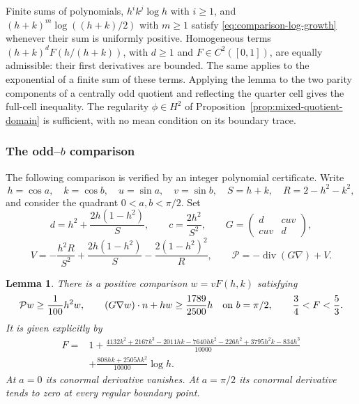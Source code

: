 \documentclass[reqno,11pt]{amsart}
\numberwithin{equation}{section}
\newtheorem{lemma}[theorem]{Lemma}
\theoremstyle{remark}
\begin{document}
Finite sums of polynomials, $h^ik^j\log h$ with $i\geq1$, and
$(h+k)^m\log((h+k)/2)$ with $m\geq1$ satisfy
\eqref{eq:comparison-log-growth} whenever their sum is uniformly
positive.  Homogeneous terms $(h+k)^d F(h/(h+k))$, with
$d\geq1$ and $F\in C^2([0,1])$, are equally admissible: their
first derivatives are bounded. The same applies to the exponential
of a finite sum of these terms. Applying the lemma to the two parity
components of a centrally odd quotient and reflecting the quarter
cell gives the full-cell inequality. The regularity
$\phi\in H^2$ of Proposition~\ref{prop:mixed-quotient-domain} is sufficient, with no mean condition on its boundary trace.



\subsubsection{The odd--$b$ comparison}
The following comparison is verified by an integer polynomial certificate.
Write
\[
 h=\cos a,\quad k=\cos b,\quad u=\sin a,\quad v=\sin b,
 \quad S=h+k,\quad R=2-h^2-k^2,
\]
and consider the quadrant $0<a,b<\pi/2$.  Set
\[
 d=h^2+\frac{2h(1-h^2)}S,\qquad c=\frac{2h^2}{S^2},
 \qquad
 G=\begin{pmatrix}d&cuv\\cuv&d\end{pmatrix},
\]
\[
 V=-\frac{h^2R}{S^2}+\frac{2h(1-h^2)}S
       -\frac{2(1-h^2)^2}R,
 \qquad \mathcal P=-\operatorname{div}(G\nabla)+V.
\]
\begin{lemma}\label{lem:mixed-v-comparison}
There is a positive comparison $w=vF(h,k)$ satisfying
\[
 \mathcal P w\ge\frac1{100}h^2w,\qquad
 (G\nabla w)\cdot n+hw\ge\frac{1789}{2500}h
       \quad\hbox{on }b=\pi/2,
 \qquad \frac34<F<\frac53.
\]
It is given explicitly by
\begin{align*}
 F={}&1+\frac{4132k^2+2167k^3-2011hk-7640hk^2
                    -226h^2+3795h^2k-834h^3}{10000}\\
    &+\frac{808hk+2505hk^2}{10000}\log h.
\end{align*}
At $a=0$ its conormal derivative vanishes.  At $a=\pi/2$ its
conormal derivative tends to zero at every regular boundary point.
\end{lemma}
\end{document}
